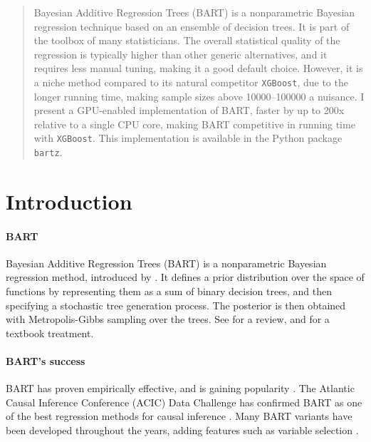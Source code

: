 \documentclass{article}
\begin{document}
    \begin{abstract}
        
        Bayesian Additive Regression Trees (BART) is a nonparametric Bayesian regression technique based on an ensemble of decision trees. It is part of the toolbox of many statisticians. The overall statistical quality of the regression is typically higher than other generic alternatives, and it requires less manual tuning, making it a good default choice. However, it is a niche method compared to its natural competitor \texttt{XGBoost}, due to the longer running time, making sample sizes above \num{10000}--\num{100000} a nuisance. I present a GPU-enabled implementation of BART, faster by up to 200x relative to a single CPU core, making BART competitive in running time with \texttt{XGBoost}. This implementation is available in the Python package \texttt{bartz}.

    \end{abstract}

    \section{Introduction}
    \label{sec:intro}

    \paragraph{BART}

    Bayesian Additive Regression Trees (BART) is a nonparametric Bayesian regression method, introduced by \citet{chipman2006,chipman2010}. It defines a prior distribution over the space of functions by representing them as a sum of binary decision trees, and then specifying a stochastic tree generation process. The posterior is then obtained with Metropolis-Gibbs sampling over the trees. See \citet{hill2020} for a review, and \citet[ch.~5]{daniels2023} for a textbook treatment.

    \paragraph{BART's success}
    
    BART has proven empirically effective, and is gaining popularity \citep[consider, e.g.,][]{tan2019}. The Atlantic Causal Inference Conference (ACIC) Data Challenge has confirmed BART as one of the best regression methods for causal inference \citep{dorie2019,hahn2019,acic2019,thal2023}. Many BART variants have been developed throughout the years, adding features such as variable selection \citep{linero2018}.
\end{document}
